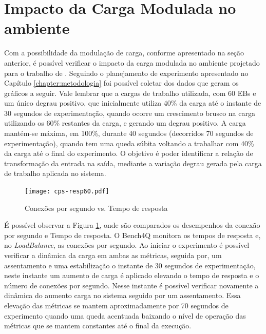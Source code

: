 \section{Impacto da Carga Modulada no ambiente}
Com a possibilidade da modulação de carga, conforme apresentado na seção anterior, é possível verificar o impacto da carga modulada no ambiente projetado para o trabalho de . Seguindo o planejamento de experimento apresentado no Capítulo \ref{chapter:metodologia} foi possível coletar dos dados que geram os gráficos a seguir.
Vale lembrar que a cargas de trabalho utilizada, com 60 EBs e um único degrau positivo, que inicialmente utiliza 40\% da carga até o instante de 30 segundos de experimentação, quando ocorre um crescimento brusco na carga utilizando os 60\% restantes da carga, e gerando um degrau positivo. A carga mantém-se máxima, em 100\%, durante 40 segundos (decorridos 70 segundos de experimentação), quando tem uma queda súbita voltando a trabalhar com 40\% da carga até o final do experimento. O objetivo é poder identificar a relação de transformação da entrada na saída, mediante a variação degrau gerada pela carga de trabalho aplicada no sistema.

\begin{figure}[htb]
	\centering
	\texttt{[image: cps-resp60.pdf]}	
	\caption{Conexões por segundo vs. Tempo de resposta}
	\label{fig:cps-resp60}
	\fdadospesquisa
\end{figure}

É possível observar a Figura \ref{fig:cps-resp60}, onde são comparados os desempenhos da conexão por segundo e Tempo de resposta. O Bench4Q monitora os tempos de resposta e, no \textit{LoadBalance}, as conexões por segundo. Ao iniciar o experimento é possível verificar a dinâmica da carga em ambas as métricas, seguida por, um assentamento e uma estabilização o instante de 30 segundos de experimentação, neste instante um aumento de carga é aplicado elevando o tempo de resposta e o número de conexões por segundo. Nesse instante é possível verificar novamente a dinâmica do aumento carga no sistema seguido por um assentamento. Essa elevação das métricas se mantem aproximadamente por 70 segundos de experimento quando uma queda acentuada baixando o nível de operação das métricas que se mantem constantes até o final da execução. 


